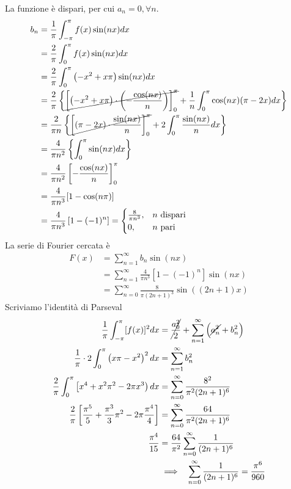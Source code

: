 La funzione è dispari, per cui $a_{n} = 0, \forall n$.
\begin{align*}
b_{n} & = \frac{1}{\pi}\int^{\pi}_{- \pi} f(x)\sin(nx) dx\\
 & = \frac{2}{\pi}\int^{\pi}_{0} f(x)\sin(nx) dx\\
 & = \frac{2}{\pi}\int^{\pi}_{0}\left(- x^{2} + x\pi \right)\sin(nx) dx\\
 & = \frac{2}{\pi}\left\{\cancel{\left[\left(- x^{2} + x\pi \right) \cdot \left(- \frac{\cos(nx)}{n}\right)\right]^{\pi}_{0}} + \frac{1}{n}\int^{\pi}_{0}\cos(nx)(\pi - 2x) dx\right\}\\
 & = \frac{2}{\pi n}\left\{\cancel{\left[(\pi - 2x) \cdot \frac{\sin(nx)}{n}\right]^{\pi}_{0}} + 2\int^{\pi}_{0}\frac{\sin(nx)}{n} dx\right\}\\
 & = \frac{4}{\pi n^{2}}\left\{\int^{\pi}_{0}\sin(nx) dx\right\}\\
 & = \frac{4}{\pi n^{2}}\left[ - \frac{\cos(nx)}{n}\right]^{\pi}_{0}\\
 & = \frac{4}{\pi n^{3}}[ 1 - \cos(n\pi)]\\
 & = \frac{4}{\pi n^{3}}\left[ 1 - (- 1)^{n}\right] = 
 \begin{cases}
\frac{8}{\pi n^{3}}, & n\ \text{dispari}\\
0, & n\ \text{pari}
\end{cases}
\end{align*}
La serie di Fourier cercata è
\begin{align*}
F(x) & = \sum\limits^{\infty}_{n = 1} b_{n}\sin(nx)\\
 & = \sum\limits^{\infty}_{n = 1}\frac{4}{\pi n^{3}}\left[ 1 - (- 1)^{n}\right]\sin(nx)\\
 & = \sum\limits^{\infty}_{n = 0}\frac{8}{\pi (2n + 1)^{3}}\sin((2n + 1) x)
\end{align*}
Scriviamo l'identità di Parseval
\begin{align*}
\frac{1}{\pi}\int^{\pi}_{- \pi}[ f(x)]^{2} dx & = \cancel{\frac{a^{2}_{0}}{2}} + \sum\limits^{\infty}_{n = 1}\left(\cancel{a^{2}_{n}} + b^{2}_{n}\right)\\
\frac{1}{\pi} \cdot 2\int^{\pi}_{0}\left(x\pi - x^{2}\right)^{2} dx & = \sum\limits^{\infty}_{n = 1} b^{2}_{n}\\
\frac{2}{\pi}\int^{\pi}_{0}\left[ x^{4} + x^{2} \pi^{2} - 2\pi x^{3}\right) dx & = \sum\limits^{\infty}_{n = 0}\frac{8^{2}}{\pi^{2}(2n + 1)^{6}}\\
\frac{2}{\pi}\left[\frac{\pi^{5}}{5} + \frac{\pi^{3}}{3} \pi^{2} - 2\pi \frac{\pi^{4}}{4}\right] & = \sum\limits^{\infty}_{n = 0}\frac{64}{\pi^{2}(2n + 1)^{6}}\\
\frac{\pi^{4}}{15} & = \frac{64}{\pi^{2}}\sum\limits^{\infty}_{n = 0}\frac{1}{(2n + 1)^{6}}\\
 & \implies \ \ \sum\limits^{\infty}_{n = 0}\frac{1}{(2n + 1)^{6}} = \frac{\pi^{6}}{960}
\end{align*}
